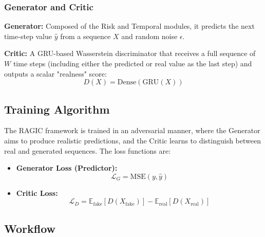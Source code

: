 \subsubsection{Generator and Critic}

\textbf{Generator:} Composed of the Risk and Temporal modules, it predicts the next time-step value $\hat{y}$ from a sequence $X$ and random noise $\epsilon$.

\textbf{Critic:} A GRU-based Wasserstein discriminator that receives a full sequence of $W$ time steps (including either the predicted or real value as the last step) and outputs a scalar "realness" score:
\[
D(X) = \text{Dense}(\text{GRU}(X))
\]

\subsection{Training Algorithm}

The RAGIC framework is trained in an adversarial manner, where the Generator aims to produce realistic predictions, and the Critic learns to distinguish between real and generated sequences. The loss functions are:

\begin{itemize}
    \item \textbf{Generator Loss (Predictor):}
    \[
    \mathcal{L}_G = \text{MSE}(y, \hat{y})
    \]
    
    \item \textbf{Critic Loss:}
    \[
    \mathcal{L}_D = \mathbb{E}_{\text{fake}}[D(X_{\text{fake}})] - \mathbb{E}_{\text{real}}[D(X_{\text{real}})]
    \]
\end{itemize}

\subsection{Workflow}

